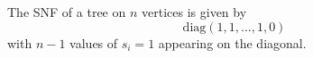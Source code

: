 \begin{theorem}
    The SNF of a tree on $n$ vertices is given by $$\text{diag}(1,1,...,1,0)$$ with $n-1$ values of $s_i = 1$ appearing on the diagonal.
\end{theorem}